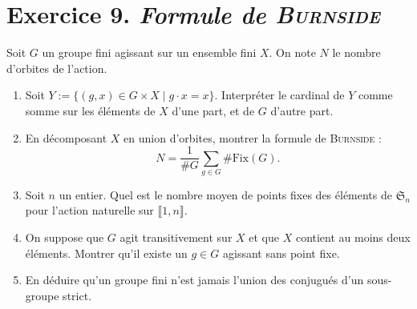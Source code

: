 \documentclass[./main]{subfiles}
\begin{document}
  \section{Exercice 9. \textit{Formule de \textsc{\textit{Burnside}}}}
  \begin{enonce}
    Soit $G$ un groupe fini agissant sur un ensemble fini $X$. On note $N$ le nombre d'orbites de l'action.
    \begin{enumerate}
      \item Soit $Y := \{(g,x)\in G \times X \mid g \cdot x = x\}$.
        Interpréter le cardinal de $Y$ comme somme sur les éléments de $X$ d'une part, et de $G$ d'autre part.
      \item En décomposant $X $ en union d'orbites, montrer la formule de \textsc{Burnside} : \[
          N = \frac{1}{\#G}\sum_{g \in G} \# \mathrm{Fix}(G)
        .\]
      \item Soit $n$ un entier. Quel est le nombre moyen de points fixes des éléments de $\mathfrak{S}_n$ pour l'action naturelle sur $\llbracket 1, n \rrbracket$.
      \item On suppose que $G$ agit transitivement sur $X$ et que $X$ contient au moins deux éléments. Montrer qu'il existe un $g \in G$ agissant sans point fixe.
      \item En déduire qu'un groupe fini n'est jamais l'union des conjugués d'un sous-groupe strict.
    \end{enumerate}
  \end{enonce}
\end{document}
